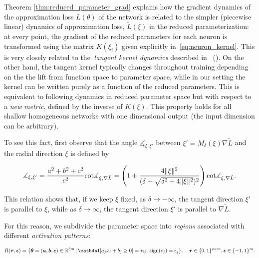 Theorem \ref{thm:reduced_parameter_grad} explains how the gradient dynamics of the approximation loss $L(\theta)$ of the network is related to the simpler (piecewise linear) dynamics of approximation loss, $\tilde{L}(\xi)$ in the reduced parameterization: at every point, the gradient of the reduced parameters for each neuron is transformed using the matrix $K(\xi_i)$ given explicitly in~\eqref{eq:neuron_kernel}. This is very closely related to the~\emph{tangent kernel dynamics} described in~ \cite{NTKJacot} (). On the other hand, the tangent kernel typically changes throughout training depending on the the lift from function space to parameter space, while in our setting the kernel can be written purely as a function of the reduced parameters. This is equivalent to following dynamics in reduced parameter space but with respect to a \emph{new metric}, defined by the inverse of $K(\xi)$. This property holds for all shallow homogeneous networks with one dimensional output (the input dimension can be arbitrary).



To see this fact, first observe that the angle $\measuredangle_{\xi,\xi'}$ between $\xi' = M_\delta(\xi) \nabla \tilde{L}$ and the radial direction $\xi$ is defined by

\begin{equation}
    \measuredangle_{\xi,\xi'} = \frac{a^2 + b^2 + c^2}{c^2} {\rm cot} \measuredangle_{\xi,\nabla \tilde{L}}= \left(1 + \frac{4\|\xi\|^2}{(\delta + \sqrt{\delta^2 + 4 \|\xi\|^2})^2}\right) {\rm cot} \measuredangle_{\xi,\nabla \tilde{L}}.
\end{equation}

This relation shows that, if we keep $\xi$ fixed, as $\delta \rightarrow -\infty$, the tangent direction $\xi'$ is parallel to $\xi$, while as $\delta \rightarrow \infty$, the tangent direction $\xi'$ is parallel to $\nabla \tilde{L}$.



For this reason, we subdivide the parameter space into \emph{regions} associated with different \emph{activation patterns}: 

\begin{equation}
    R(\bm \tau,\bm \epsilon) = \{\bm \theta = (\bm a, \bm b, \bm c) \in \RR^{3m} \, | \, \mathds 1 [a_j x_i + b_j \ge 0] = \tau_{ij},\, {\rm sign}(c_j) = \epsilon_j\}, \quad \bm \tau \in \{0,1\}^{s \times m}, \bm \epsilon \in \{-1,1\}^{m}.
\end{equation}

